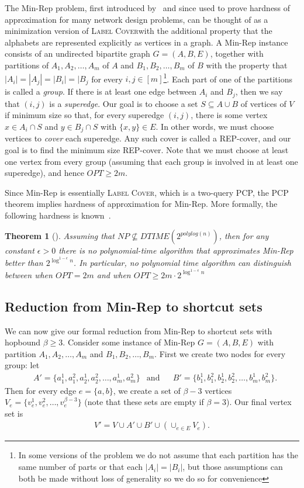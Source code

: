 \documentclass{article}
\newtheorem{theorem}{Theorem}[section]
\theoremstyle{definition}
\theoremstyle{remark}
\newcommand{\LabelCover}{\textsc{Label Cover}}
\begin{document}
The Min-Rep problem, first introduced by~\cite{Kor01} and since used to prove hardness of approximation for many network design problems, can be thought of as a minimization version of \LabelCover with the additional property that the alphabets are represented explicitly as vertices in a graph.  A Min-Rep instance consists of an undirected bipartite graph $G = (A, B, E)$, together with partitions of $A_1, A_2, \dots, A_{m}$ of $A$ and $B_1, B_2, \dots, B_m$ of $B$ with the property that $|A_i| = |A_j| = |B_i| = |B_j$ for every $i,j \in [m]$\footnote{In some versions of the problem we do not assume that each partition has the same number of parts or that each $|A_i|=|B_i|$, but those assumptions can both be made without loss of generality so we do so for convenience}.  Each part of one of the partitions is called a \emph{group}.  If there is at least one edge between $A_i$ and $B_j$, then we say that $(i,j)$ is a \emph{superedge}.  Our goal is to choose a set $S \subseteq A \cup B$ of vertices of $V$ if minimum size so that, for every superedge $(i,j)$, there is some vertex $x \in A_i \cap S$ and $y \in B_j \cap S$ with $\{x,y\} \in E$.  In other words, we must choose vertices to \emph{cover} each superedge.  Any such cover is called a REP-cover, and our goal is to find the minimum size REP-cover.  Note that we must choose at least one vertex from every group (assuming that each group is involved in at least one superedge), and hence $OPT \geq 2m$.  

Since Min-Rep is essentially \LabelCover, which is a two-query PCP, the PCP theorem implies hardness of approximation for Min-Rep.  More formally, the following hardness is known~\cite{Kor01}.

\begin{theorem}[\cite{Kor01}] \label{thm:MinRep-hardness}
    Assuming that $NP \not\subseteq DTIME(2^{polylog(n)})$, then for any constant $\epsilon > 0$ there is no polynomial-time algorithm that approximates Min-Rep better than $2^{\log^{1-\epsilon} n}$.  In particular, no polynomial time algorithm can distinguish between when $OPT = 2m$ and when $OPT \geq 2m \cdot 2^{\log^{1-\epsilon} n}$
\end{theorem}


\subsection{Reduction from Min-Rep to shortcut sets}
We can now give our formal reduction from Min-Rep to shortcut sets with hopbound $\beta \geq 3$.  Consider some instance of Min-Rep $G = (A, B, E)$ with partition $A_1, A_2, \dots, A_m$ and $B_1, B_2, \dots, B_m$.  First we create two nodes for every group: let 
\begin{align*}
&A' = \{a_1^1, a_1^2, a_2^1, a_2^2, \dots, a_m^1, a_m^2\} & \text{and} &  &B' = \{b_1^1, b_1^2, b_2^1,b_2^2, \dots, b_m^1, b_m^2\}.
\end{align*}
Then for every edge $e = \{a, b\}$, we create a set of $\beta - 3$ vertices $V_e = \{v_e^1, v_e^2, \dots, v_e^{\beta-3}\}$ (note that these sets are empty if $\beta=3$).  Our final vertex set is 
\begin{align*}
    V' = V \cup A' \cup B' \cup (\cup_{e \in E} V_e).
\end{align*}
\end{document}
